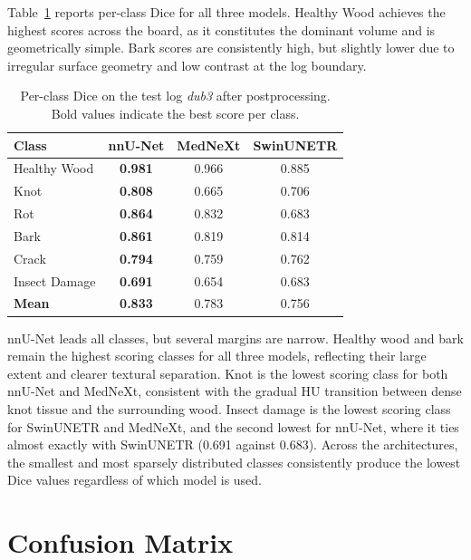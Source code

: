 Table~\ref{tab:perclass_results} reports per-class Dice for all three models. Healthy Wood achieves the highest scores across the board, as it constitutes the dominant volume and is geometrically simple. Bark scores are consistently high, but slightly lower due to irregular surface geometry and low contrast at the log boundary.

\begin{table}[H]
    \centering
    \caption{Per-class Dice on the test log \textit{dub3} after postprocessing. Bold values indicate the best score per class.}
    \label{tab:perclass_results}
    \begin{tabular}{lccc}
        \toprule
        \textbf{Class} & \textbf{nnU-Net} & \textbf{MedNeXt} & \textbf{SwinUNETR} \\
        \midrule
        Healthy Wood  & \textbf{0.981} & 0.966 & 0.885 \\
        Knot          & \textbf{0.808} & 0.665 & 0.706 \\
        Rot           & \textbf{0.864} & 0.832 & 0.683 \\
        Bark          & \textbf{0.861} & 0.819 & 0.814 \\
        Crack         & \textbf{0.794} & 0.759 & 0.762 \\
        Insect Damage & \textbf{0.691} & 0.654 & 0.683 \\
        \midrule
        \textbf{Mean} & \textbf{0.833} & 0.783 & 0.756 \\
        \bottomrule
    \end{tabular}
\end{table}

nnU-Net leads all classes, but several margins are narrow. Healthy wood and bark remain the highest scoring classes for all three models, reflecting their large extent and clearer textural separation. Knot is the lowest scoring class for both nnU-Net and MedNeXt, consistent with the gradual HU transition between dense knot tissue and the surrounding wood. Insect damage is the lowest scoring class for SwinUNETR and MedNeXt, and the second lowest for nnU-Net, where it ties almost exactly with SwinUNETR (0.691 against 0.683). Across the architectures, the smallest and most sparsely distributed classes consistently produce the lowest Dice values regardless of which model is used.

\section{Confusion Matrix}

